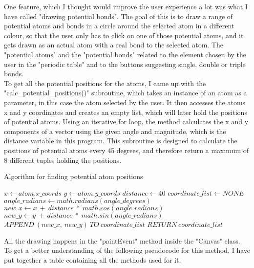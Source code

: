 \documentclass[a4paper,12pt]{article}
\begin{document}
One feature, which I thought would improve the user experience a lot was what I have called "drawing potential bonds". The goal of this is to draw a range of potential atoms and bonds in a circle around the selected atom in a different colour, so that the user only has to click on one of those potential atoms, and it gets drawn as an actual atom with a real bond to the selected atom. The "potential atoms" and the "potential bonds" related to the element chosen by the user in the "periodic table" and to the buttons suggesting single, double or triple bonds.\\
To get all the potential positions for the atoms, I came up with the\\ "calc\_potential\_positions()" subroutine, which takes an instance of an atom as a parameter, in this case the atom selected by the user. It then accesses the atoms x and y coordinates and creates an empty list, which will later hold the positions of potential atoms. Using an iterative for loop, the method calculates the x and y components of a vector using the given angle and magnitude, which is the distance variable in this program. This subroutine is designed to calculate the positions of potential atoms every 45 degrees, and therefore return a maximum of 8 different tuples holding the positions.

\begin{algorithm}
\footnotesize
\caption{Algorithm for finding potential atom positions}\label{alg:cap}
\begin{algorithmic}
\State $ x\gets atom.x\_coords$
\State $ y\gets atom.y\_coords$
\State $ distance\gets 40$
\State $ coordinate\_list\gets NONE$
	\State $ angle\_radians\gets math.radians(angle\_degrees)$
	\State $ new\_x\gets x\ +\ distance\ *\ math.cos(angle\_radians)$
	\State $ new\_y\gets y\ +\ distance\ *\ math.sin(angle\_radians)$
	\State $ APPEND\ (new\_x,\ new\_y)\ TO\ coordinate\_list$
\EndFor
\State $ RETURN\ coordinate\_list$
\EndFunction
\end{algorithmic}
\end{algorithm}

All the drawing happens in the "paintEvent" method inside the "Canvas" class. To get a better understanding of the following pseudocode for this method, I have put together a table containing all the methods used for it.
\end{document}
